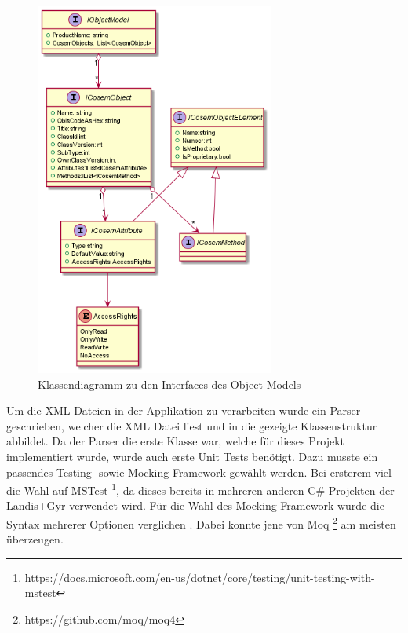 \begin{figure}
   \centering
   \includegraphics[width=0.7\textwidth]{gfx/ObjectModel_interfaces.png}
   \caption{
      Klassendiagramm zu den Interfaces des Object Models
      }
      \label{fig:objectModelInterface}
\end{figure}

Um die XML Dateien in der Applikation zu verarbeiten wurde ein Parser geschrieben, welcher die XML Datei liest und in die gezeigte Klassenstruktur abbildet.
Da der Parser die erste Klasse war, welche für dieses Projekt implementiert wurde, wurde auch erste Unit Tests benötigt.
Dazu musste ein passendes Testing- sowie Mocking-Framework gewählt werden.
Bei ersterem viel die Wahl auf MSTest \footnote{https://docs.microsoft.com/en-us/dotnet/core/testing/unit-testing-with-mstest}, da dieses bereits in mehreren anderen C\# Projekten der Landis+Gyr verwendet wird.
Für die Wahl des Mocking-Framework wurde die Syntax mehrerer Optionen verglichen \parencite{clarke_2020}.
Dabei konnte jene von Moq \footnote{https://github.com/moq/moq4} am meisten überzeugen.



